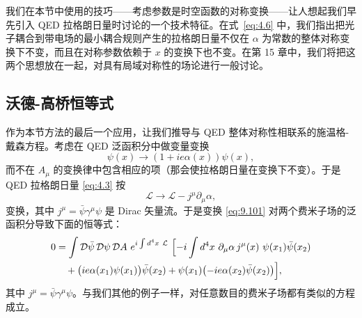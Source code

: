 我们在本节中使用的技巧——考虑参数是时空函数的对称变换——让人想起我们早先引入 QED 拉格朗日量时讨论的一个技术特征。在式~\eqref{eq:4.6} 中，我们指出把光子耦合到带电场的最小耦合规则产生的拉格朗日量不仅在 $\alpha$ 为常数的整体对称变换下不变，而且在对称参数依赖于 $x$ 的变换下也不变。在第 15 章中，我们将把这两个思想放在一起，对具有局域对称性的场论进行一般讨论。

\subsection{沃德-高桥恒等式}

作为本节方法的最后一个应用，让我们推导与 QED 整体对称性相联系的施温格-戴森方程。考虑在 QED 泛函积分中做变量变换
\begin{equation}
  \psi(x) \to (1 + ie\alpha(x))\psi(x),
  \label{eq:9.101}
\end{equation}
而不在 $A_\mu$ 的变换律中包含相应的项（那会使拉格朗日量在变换下不变）。于是 QED 拉格朗日量 \eqref{eq:4.3} 按
\begin{equation}
  \mathcal{L} \to \mathcal{L} - j^\mu\partial_\mu\alpha ,
  \label{eq:9.102}
\end{equation}
变换，其中 $j^\mu = \bar{\psi}\gamma^\mu\psi$ 是 Dirac 矢量流。于是变换 \eqref{eq:9.101} 对两个费米子场的泛函积分导致下面的恒等式：
\begin{equation}
  \begin{aligned}
    0 &= \int \mathcal{D}\bar{\psi}\,\mathcal{D}\psi\,\mathcal{D}A\
      e^{i\int d^4x\ \mathcal{L}}\ \Bigl[ -i\int d^4x\ \partial_\mu\alpha\,
      j^\mu(x)\ \psi(x_1)\bar{\psi}(x_2)\\
    &\quad + \bigl( ie\alpha(x_1)\psi(x_1) \bigr)\bar{\psi}(x_2)
      + \psi(x_1)\bigl( -ie\alpha(x_2)\bar{\psi}(x_2) \bigr) \Bigr] ,
  \end{aligned}
  \label{eq:9.103}
\end{equation}
其中 $j^\mu = \bar{\psi}\gamma^\mu\psi$。与我们其他的例子一样，对任意数目的费米子场都有类似的方程成立。

